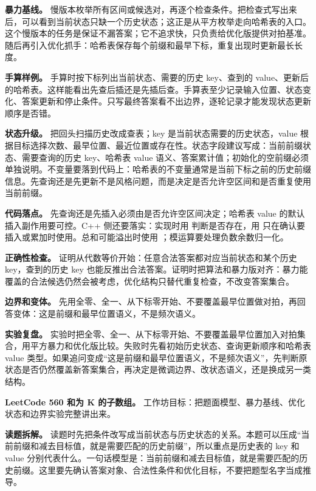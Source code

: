 \textbf{暴力基线。} 慢版本枚举所有区间或候选对，再逐个检查条件。把检查式写出来后，可以看到当前状态只缺一个历史状态；这正是从平方枚举走向哈希表的入口。这个慢版本的任务是保证不漏答案；它不追求快，只负责给优化版提供对拍基准。随后再引入优化抓手：哈希表保存每个前缀和最早下标，重复出现时更新最长长度。

\textbf{手算样例。} 手算时按下标列出当前状态、需要的历史 key、查到的 value、更新后的哈希表。这样能看出先查后插还是先插后查。手算表至少记录输入位置、状态变化、答案更新和停止条件。只写最终答案看不出边界，逐轮记录才能发现状态更新顺序是否错。

\textbf{状态升级。} 把回头扫描历史改成查表；key 是当前状态需要的历史状态，value 根据目标选择次数、最早位置、最近位置或存在性。状态字段建议写成：当前前缀状态、需要查询的历史 key、哈希表 value 语义、答案累计值；初始化的空前缀必须单独说明。不变量要落到代码上：哈希表的不变量通常是当前下标之前的历史前缀信息。先查询还是先更新不是风格问题，而是决定是否允许空区间和是否重复使用当前前缀。

\textbf{代码落点。} 先查询还是先插入必须由是否允许空区间决定；哈希表 value 的默认插入副作用要可控。C++ 侧还要落实：实现时用  判断是否存在，用  只在确认要插入或累加时使用。总和可能溢出时使用 ；模运算要处理负数余数归一化。

\textbf{正确性检查。} 证明从代数等价开始：任意合法答案都对应当前状态和某个历史 key，查到的历史 key 也能反推出合法答案。证明时把算法和暴力版对齐：暴力能覆盖的合法候选仍然会被考虑，优化结构只替代重复检查，不改变答案集合。

\textbf{边界和变体。} 先用全零、全一、从下标零开始、不要覆盖最早位置做对拍，再回答变体：这是前缀和最早位置语义，不是频次语义。

\textbf{实验复盘。} 实验时把全零、全一、从下标零开始、不要覆盖最早位置加入对拍集合，用平方暴力和优化版比较。失败时先看初始历史状态、查询更新顺序和哈希表 value 类型。如果追问变成“这是前缀和最早位置语义，不是频次语义”，先判断原状态是否仍然覆盖新答案集合，再决定是微调边界、改状态语义，还是换成另一类结构。

\noindent\textbf{LeetCode 560 和为 K 的子数组。} 工作坊目标：把题面模型、暴力基线、优化状态和边界实验完整讲出来。

\textbf{读题拆解。} 读题时先把条件改写成当前状态与历史状态的关系。本题可以压成“当前前缀和减去目标值，就是需要匹配的历史前缀”，所以重点是历史表的 key 和 value 分别代表什么。一句话模型是：当前前缀和减去目标值，就是需要匹配的历史前缀。这里要先确认答案对象、合法性条件和优化目标，不要把题型名字当成推导。

